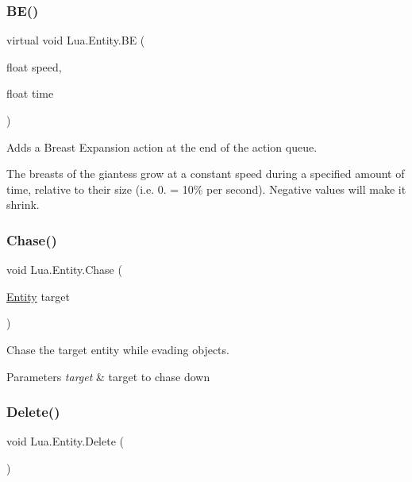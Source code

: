 \subsubsection{\texorpdfstring{BE()}{BE()}\hspace{0.1cm}{\footnotesize\ttfamily [2/2]}}
{\footnotesize\ttfamily virtual void Lua.\+Entity.\+BE (\begin{DoxyParamCaption}\item[{float}]{speed,  }\item[{float}]{time }\end{DoxyParamCaption})\hspace{0.3cm}{\ttfamily [virtual]}}



Adds a Breast Expansion action at the end of the action queue. 

The breasts of the giantess grow at a constant speed during a specified amount of time, relative to their size (i.\+e. 0. = 10\% per second). Negative values will make it shrink. \mbox{\label{class_lua_1_1_entity_ab4f0e1c31b16110cdadb7479ba008423}} 
\subsubsection{\texorpdfstring{Chase()}{Chase()}}
{\footnotesize\ttfamily void Lua.\+Entity.\+Chase (\begin{DoxyParamCaption}\item[{\mbox{\hyperlink{class_lua_1_1_entity}{Entity}}}]{target }\end{DoxyParamCaption})}



Chase the target entity while evading objects. 


\begin{DoxyParams}{Parameters}
{\em target} & target to chase down\\
\hline
\end{DoxyParams}
\mbox{\label{class_lua_1_1_entity_a422af2c756caecc01bad49a14ba5da7f}} 
\subsubsection{\texorpdfstring{Delete()}{Delete()}}
{\footnotesize\ttfamily void Lua.\+Entity.\+Delete (\begin{DoxyParamCaption}{ }\end{DoxyParamCaption})}



